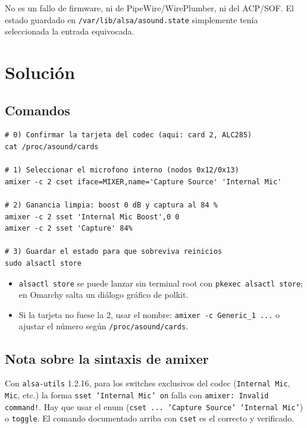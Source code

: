 \documentclass[12pt,a4paper]{article}
\begin{document}
No es un fallo de firmware, ni de PipeWire/WirePlumber, ni del ACP/SOF.
El estado guardado en \texttt{/var/lib/alsa/asound.state} simplemente tenía
seleccionada la entrada equivocada.

\section{Solución}

\subsection{Comandos}

\begin{lstlisting}[style=bash]
# 0) Confirmar la tarjeta del codec (aqui: card 2, ALC285)
cat /proc/asound/cards

# 1) Seleccionar el microfono interno (nodos 0x12/0x13)
amixer -c 2 cset iface=MIXER,name='Capture Source' 'Internal Mic'

# 2) Ganancia limpia: boost 0 dB y captura al 84 %
amixer -c 2 sset 'Internal Mic Boost',0 0
amixer -c 2 sset 'Capture' 84%

# 3) Guardar el estado para que sobreviva reinicios
sudo alsactl store
\end{lstlisting}

\begin{itemize}
  \item \texttt{alsactl store} se puede lanzar sin terminal root con
        \texttt{pkexec alsactl store}; en Omarchy salta un diálogo gráfico de
        polkit.
  \item Si la tarjeta no fuese la 2, usar el nombre:
        \texttt{amixer -c Generic\_1 ...} o ajustar el número según
        \texttt{/proc/asound/cards}.
\end{itemize}

\subsection{Nota sobre la sintaxis de amixer}

Con \texttt{alsa-utils} 1.2.16, para los switches exclusivos del codec
(\texttt{Internal Mic}, \texttt{Mic}, etc.) la forma \texttt{sset 'Internal
Mic' on} falla con \texttt{amixer: Invalid command!}. Hay que usar el enum
(\texttt{cset ... 'Capture Source' 'Internal Mic'}) o \texttt{toggle}.
El comando documentado arriba con \texttt{cset} es el correcto y verificado.
\end{document}
